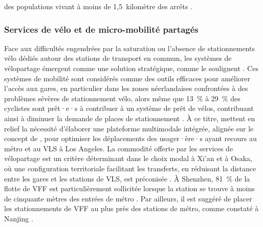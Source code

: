 \begin{refsegment}
des populations vivant à moins de 1,5~kilomètre des arrêts \textcolor{blue}{\autocite[188]{pan_intermodal_2010}}.%

\subsubsection*{Services de vélo et de micro-mobilité partagés
    \label{chap2:services-velo-micromobilite-partages}
    }
    
Face aux difficultés engendrées par la saturation ou l'absence de stationnements vélo dédiés autour des stations de transport en commun, les systèmes de vélopartage émergent comme une solution stratégique, comme le soulignent \textcolor{blue}{\textcite[10]{jonkeren_bicycle_2021}}. Ces systèmes de mobilité sont considérés comme des outils efficaces pour améliorer l'accès aux gares, en particulier dans les zones néerlandaises confrontées à des problèmes sévères de stationnement vélo, alors même que 13~\% à 29~\% des cyclistes sont prêt·e·s à contribuer à un système de prêt de vélos, contribuant ainsi à diminuer la demande de places de stationnement \textcolor{blue}{\autocite[472]{goeverden_potential_2018}}. À ce titre, \textcolor{blue}{\textcite[762]{nam_designing_2018}} mettent en relief la nécessité d'élaborer une plateforme multimodale intégrée, alignée sur le concept de , pour optimiser les déplacements des usager·ère·s ayant recours au métro et au \acrshort{VLS} à Los Angeles. La commodité offerte par les services de vélopartage est un critère déterminant dans le choix modal à Xi'an et à Osaka, où une configuration territoriale facilitant les transferts, en réduisant la distance entre les gares et les stations de \acrshort{VLS}, est préconisée \textcolor{blue}{\autocites[172]{yang_bike-and-ride_2014}[3~416]{tomita_demand_2017}}. À Shenzhen, 81~\% de la flotte de \acrshort{VFF} est particulièrement sollicitée lorsque la station se trouve à moins de cinquante mètres des entrées de métro \textcolor{blue}{\autocite[11, 18]{wu_identification_2023}}. Par ailleurs, il est suggéré de placer les stationnements de \acrshort{VFF} au plus près des stations de métro, comme constaté à Nanjing \textcolor{blue}{\autocite[186]{cheng_exploring_2022}}.%


\end{refsegment}
